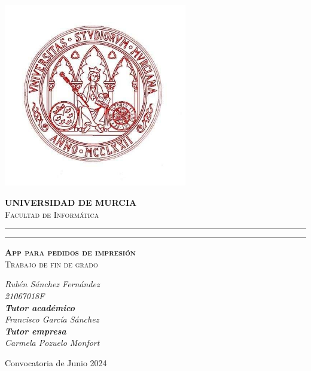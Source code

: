\documentclass[12pt]{article}
\begin{document}
\begin{titlepage}
    \begin{center}

        {\phantom{a}\par}

        \includegraphics[width=0.6\textwidth]{imagenes/logo.jpg}

        \scshape\Large\textbf{UNIVERSIDAD DE MURCIA}
        \\\scshape\Large Facultad de Informática

        \rule{\linewidth}{0.1pt}
        \rule{\linewidth}{0.1pt}

        \vspace{1cm}
        \scshape\huge\textbf{App para pedidos de impresión}\\
        \scshape\Large Trabajo de fin de grado


        \vspace{1cm}

        \itshape\large
        Rubén Sánchez Fernández\\
        21067018F\\

        \vspace{0.5cm}
        \textbf{Tutor académico}\\
        \itshape\large
        Francisco García Sánchez\\
        \textbf{Tutor empresa}\\
        \itshape\large
        Carmela Pozuelo Monfort\\
        \vspace{0.5cm}


        \vfill
        {\large Convocatoria de Junio 2024}
    \end{center}
\end{titlepage}
\end{document}
